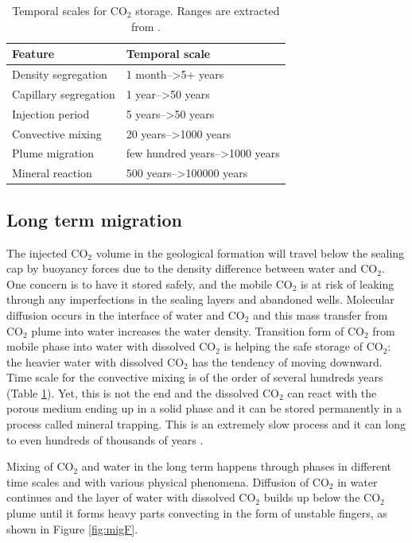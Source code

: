 \begin{table}
\center
\begin{tabular}{ |l|| l| }
    \hline
    Feature& Temporal scale \\
    \hline
    Density segregation & 1 month-->5+ years\\
    \hline
    Capillary segregation & 1 year-->50 years\\
    \hline
    Injection period & 5 years-->50 years\\
    \hline
    Convective mixing & 20 years-->1000 years\\
    \hline
    Plume migration & few hundred years-->1000 years\\
    \hline
    Mineral reaction & 500 years-->100000 years \\
    \hline
  \end{tabular}
  \caption{Temporal scales for $\mbox{CO}_2$ storage. Ranges are extracted from
\cite{celia2011geological,gunter1997aquifer}.}
  \label{tab:tscl}
\end{table}

\subsection{Long term migration}

The injected $\mbox{CO}_2$ volume in the geological formation will travel below
the sealing cap by buoyancy forces due to the density difference between water
and $\mbox{CO}_2$. One concern is to have it stored safely, and the mobile
$\mbox{CO}_2$ is at risk of leaking through any imperfections in the sealing
layers and abandoned wells. Molecular diffusion occurs in the interface of water
and $\mbox{CO}_2$ and this mass transfer from $\mbox{CO}_2$ plume into water
increases the water density. Transition form of $\mbox{CO}_2$ from mobile phase
into water with dissolved $\mbox{CO}_2$ is helping the safe storage of
$\mbox{CO}_2$: the heavier water with dissolved $\mbox{CO}_2$ has the tendency
of moving downward. Time scale for the convective mixing is of the order of
several hundreds years (Table \ref{tab:tscl}). Yet, this is not the end and   the
dissolved $\mbox{CO}_2$ can react with the porous medium ending up in a solid
phase and it can be stored permanently in a process called mineral trapping.
This is an 
extremely slow process and it can long to even hundreds of thousands of years
\cite{gunter1997aquifer}.

Mixing of $\mbox{CO}_2$ and water in the long term happens through phases in
different time scales and with various physical phenomena. Diffusion of
$\mbox{CO}_2$ in water continues and the layer of water with dissolved
$\mbox{CO}_2$
builds up below the $\mbox{CO}_2$ plume until it forms heavy parts convecting in
the form of unstable fingers, as shown in Figure \ref{fig:migF}.

